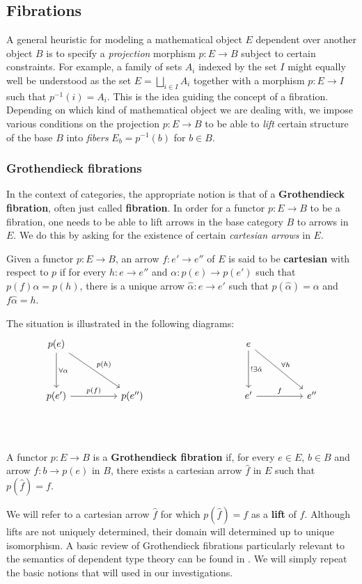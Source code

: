 \subsection{Fibrations}
A general heuristic for modeling a mathematical object $E$ dependent over another object $B$ is to specify a \textit{projection} morphism $p : E \to B$ subject to certain constraints. For example, a family of sets $A_i$ indexed by the set $I$ might equally well be understood as the set $E = \bigsqcup_{i \in I}A_i$ together with a morphism $p : E  \to I$ such that $p^{-1}(i) = A_i$. This is the idea guiding the concept of a fibration. Depending on which kind of mathematical object we are dealing with, we impose various conditions on the projection $p : E \to B$ to be able to \textit{lift} certain structure of the base $B$ into \textit{fibers} $E_b = p^{-1}(b)$ for $b \in B$.

\subsubsection{Grothendieck fibrations}
In the context of categories, the appropriate notion is that of a \textbf{Grothendieck fibration}, often just called \textbf{fibration}. In order for a functor $p : E \to B$ to be a fibration, one needs to be able to lift arrows in the base category $B$ to arrows in $E$. We do this by asking for the existence of certain \textit{cartesian arrows} in $E$.
\begin{defn}
Given a functor $p : E \to B$, an arrow $f : e' \to e''$ of $E$ is said to be \textbf{cartesian} with respect to $p$ if for every $h : e \to e''$ and $\alpha : p(e) \to p(e')$ such that $p(f)\alpha = p(h)$, there is a unique arrow $\hat \alpha : e \to e'$ such that $p(\hat \alpha) = \alpha$ and $f \hat \alpha = h$.
\end{defn}
The situation is illustrated in the following diagrams:
\[
\ti
p(e) \ar[d, "\forall \alpha"] \ar[dr, "p(h)"] & & & e \ar[d, "!\exists \hat \alpha"] \ar[dr, "\forall h"] \\
p(e') \ar[r, "p(f)"] & p(e'') & & e' \ar[r, "f"] & e''\\
\kz
\]
\begin{defn}
A functor $p: E \to B$ is a \textbf{Grothendieck fibration} if, for every $e \in E$, $b \in B$ and arrow $f : b \to p(e)$ in $B$, there exists a cartesian arrow $\hat f$ in $E$ such that $p(\hat f) = f$.
\end{defn}
We will refer to a cartesian arrow $\hat f$ for which $p(\hat f) = f$ as a \textbf{lift} of $f$. Although lifts are not uniquely determined, their domain will determined up to unique isomorphism.
A basic review of Grothendieck fibrations particularly relevant to the semantics of dependent type theory can be found in \cite{jacobs}. We will simply repeat the basic notions that will used in our investigations.
\\

